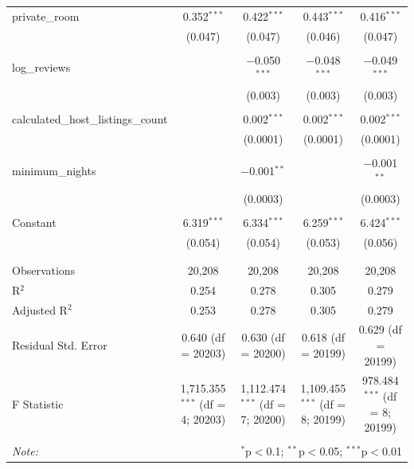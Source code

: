 \begin{table}[!htbp]
\begin{tabular}{@{\extracolsep{5pt}}lcccc}
 private\_room & 0.352$^{***}$ & 0.422$^{***}$ & 0.443$^{***}$ & 0.416$^{***}$ \\ 
  & (0.047) & (0.047) & (0.046) & (0.047) \\ 
  & & & & \\ 
 log\_reviews &  & $-$0.050$^{***}$ & $-$0.048$^{***}$ & $-$0.049$^{***}$ \\ 
  &  & (0.003) & (0.003) & (0.003) \\ 
  & & & & \\ 
 calculated\_host\_listings\_count &  & 0.002$^{***}$ & 0.002$^{***}$ & 0.002$^{***}$ \\ 
  &  & (0.0001) & (0.0001) & (0.0001) \\ 
  & & & & \\ 
 minimum\_nights &  & $-$0.001$^{**}$ &  & $-$0.001$^{**}$ \\ 
  &  & (0.0003) &  & (0.0003) \\ 
  & & & & \\ 
 Constant & 6.319$^{***}$ & 6.334$^{***}$ & 6.259$^{***}$ & 6.424$^{***}$ \\ 
  & (0.054) & (0.054) & (0.053) & (0.056) \\ 
  & & & & \\ 
\hline \\[-1.8ex] 
Observations & 20,208 & 20,208 & 20,208 & 20,208 \\ 
R$^{2}$ & 0.254 & 0.278 & 0.305 & 0.279 \\ 
Adjusted R$^{2}$ & 0.253 & 0.278 & 0.305 & 0.279 \\ 
Residual Std. Error & 0.640 (df = 20203) & 0.630 (df = 20200) & 0.618 (df = 20199) & 0.629 (df = 20199) \\ 
F Statistic & 1,715.355$^{***}$ (df = 4; 20203) & 1,112.474$^{***}$ (df = 7; 20200) & 1,109.455$^{***}$ (df = 8; 20199) & 978.484$^{***}$ (df = 8; 20199) \\ 
\hline 
\hline \\[-1.8ex] 
\textit{Note:}  & \multicolumn{4}{r}{$^{*}$p$<$0.1; $^{**}$p$<$0.05; $^{***}$p$<$0.01} \\ 
\end{tabular} 
\end{table} 
